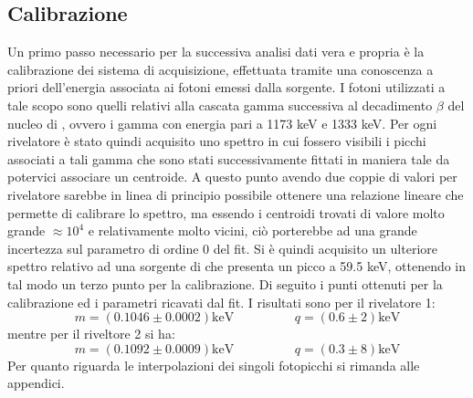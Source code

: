 \subsection{Calibrazione}
Un primo passo necessario per la successiva analisi dati vera e propria è la calibrazione dei sistema di acquisizione, effettuata tramite una conoscenza a priori dell'energia
associata ai fotoni emessi dalla sorgente. I fotoni utilizzati a tale scopo sono quelli relativi alla cascata gamma successiva al decadimento $\beta$ del nucleo di , ovvero
i gamma con energia pari a 1173 keV e 1333 keV. Per ogni rivelatore è stato quindi acquisito uno spettro in cui fossero visibili i picchi associati a tali gamma che sono stati
successivamente fittati in maniera tale da potervici associare un centroide. A questo punto avendo due coppie di valori per rivelatore sarebbe in linea di principio possibile
ottenere una relazione lineare che permette di calibrare lo spettro, ma essendo i centroidi trovati di valore molto grande $\approx 10^4$ e relativamente molto vicini, ciò
porterebbe ad una grande incertezza sul parametro di ordine 0 del fit. Si è quindi acquisito un ulteriore spettro relativo ad una sorgente di  
che presenta 
un picco a 59.5 keV, ottenendo in tal modo un terzo punto per la calibrazione. Di seguito i punti ottenuti per la calibrazione ed i parametri ricavati dal fit. I risultati sono
per il rivelatore 1:
$$ m = (0.1046 \pm 0.0002) \text{keV}\hspace{2cm} q = (0.6 \pm 2) \text{keV}$$
mentre per il riveltore 2 si ha:
$$ m = (0.1092 \pm 0.0009) \text{keV}\hspace{2cm} q = (0.3 \pm 8) \text{keV}$$
Per quanto riguarda le interpolazioni dei singoli fotopicchi si rimanda alle appendici.



